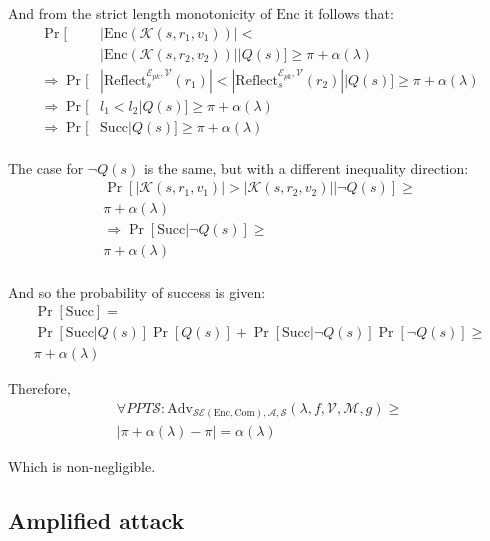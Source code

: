 \documentclass[conference, letterpaper, 10pt]{IEEEtran}
\begin{document}
\begin{IEEEproof}
And from the strict length monotonicity of $\textrm{Enc}$ it follows that:
\begin{align*}
    \Pr[&|\textrm{Enc}(\mathcal{K}(s, r_1, v_1))| <\\&|\textrm{Enc}(\mathcal{K}(s, r_2, v_2))||Q(s)]
        \geq \pi + \alpha(\lambda)\\
    \Rightarrow \Pr[&
        |\text{Reflect}^{\mathcal{E}_{pk}, \mathcal{V}}_s(r_1)|
        <
        |\text{Reflect}^{\mathcal{E}_{pk}, \mathcal{V}}_s(r_2)||Q(s)
    ]
        \geq \pi + \alpha(\lambda)\\
    \Rightarrow \Pr[&l_1 < l_2|Q(s)]
        \geq \pi + \alpha(\lambda)\\
    \Rightarrow \Pr[&\text{Succ}|Q(s)]
        \geq \pi + \alpha(\lambda)\\
\end{align*}

The case for $\lnot Q(s)$ is the same, but with a different inequality direction:
\begin{align*}
    \Pr[|\mathcal{K}(s, r_1, v_1)| > |\mathcal{K}(s, r_2, v_2)||\lnot Q(s)]
        \geq\\
        \pi + \alpha(\lambda)\\
    \Rightarrow \Pr[\text{Succ}|\lnot Q(s)] \geq\\
    \pi + \alpha(\lambda)\\
\end{align*}

And so the probability of success is given:
\begin{align*}
    \Pr[\text{Succ}] =\\
    \Pr[\text{Succ}|Q(s)]\Pr[Q(s)]
    +
    \Pr[\text{Succ}|\lnot Q(s)]\Pr[\lnot Q(s)] \geq\\
    \pi + \alpha(\lambda)
\end{align*}

Therefore,
\begin{align*}
    \forall PPT \mathcal{S}:
    \text{Adv}_{\mathcal{SE}(\textrm{Enc}, \textrm{Com}), \mathcal{A}, \mathcal{S}}
        (\lambda, f, \mathcal{V}, \mathcal{M}, g)
    \geq\\
    |\pi + \alpha(\lambda) - \pi| = \alpha(\lambda)
\end{align*}

Which is non-negligible.

\end{IEEEproof}

\subsection{Amplified attack}\label{subsec:amplification}
\end{document}
